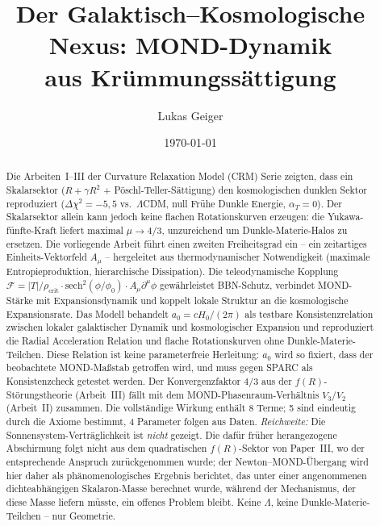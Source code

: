 \documentclass[aps,prd,twocolumn,superscriptaddress,nofootinbib]{revtex4-2}
\begin{document}

\title{Der Galaktisch--Kosmologische Nexus: MOND-Dynamik\\aus Krümmungssättigung}

\author{Lukas Geiger}

\date{\today}

\begin{abstract}
Die Arbeiten~I--III der Curvature Relaxation Model (CRM) Serie zeigten, dass ein Skalarsektor ($R + \gamma R^2$ + P\"oschl-Teller-S\"attigung) den kosmologischen dunklen Sektor reproduziert ($\Delta\chi^2 = -5{,}5$ vs.\ $\Lambda$CDM, null Fr\"uhe Dunkle Energie, $\alpha_T = 0$). Der Skalarsektor allein kann jedoch keine flachen Rotationskurven erzeugen: die Yukawa-f\"unfte-Kraft liefert maximal $\mu \to 4/3$, unzureichend um Dunkle-Materie-Halos zu ersetzen. Die vorliegende Arbeit f\"uhrt einen zweiten Freiheitsgrad ein -- ein zeitartiges Einheits-Vektorfeld $A_\mu$ -- hergeleitet aus thermodynamischer Notwendigkeit (maximale Entropieproduktion, hierarchische Dissipation). Die teleodynamische Kopplung $\mathcal{F} = |T|/\rho_{\mathrm{crit}} \cdot \mathrm{sech}^2(\phi/\phi_0) \cdot A_\mu\partial^\mu\phi$ gew\"ahrleistet BBN-Schutz, verbindet MOND-St\"arke mit Expansionsdynamik und koppelt lokale Struktur an die kosmologische Expansionsrate. Das Modell behandelt $a_0 = cH_0/(2\pi)$ als testbare Konsistenzrelation zwischen lokaler galaktischer Dynamik und kosmologischer Expansion und reproduziert die Radial Acceleration Relation und flache Rotationskurven ohne Dunkle-Materie-Teilchen. Diese Relation ist keine parameterfreie Herleitung: $a_0$ wird so fixiert, dass der beobachtete MOND-Ma\ss{}stab getroffen wird, und muss gegen SPARC als Konsistenzcheck getestet werden. Der Konvergenzfaktor $4/3$ aus der $f(R)$-St\"orungstheorie (Arbeit~III) f\"allt mit dem MOND-Phasenraum-Verh\"altnis $V_3/V_2$ (Arbeit~II) zusammen. Die vollst\"andige Wirkung enth\"alt 8 Terme; 5 sind eindeutig durch die Axiome bestimmt, 4 Parameter folgen aus Daten. \textit{Reichweite:} Die Sonnensystem-Vertr\"aglichkeit ist \textit{nicht} gezeigt. Die daf\"ur fr\"uher herangezogene Abschirmung folgt nicht aus dem quadratischen $f(R)$-Sektor von Paper~III, wo der entsprechende Anspruch zur\"uckgenommen wurde; der Newton--MOND-\"Ubergang wird hier daher als ph\"anomenologisches Ergebnis berichtet, das unter einer angenommenen dichteabh\"angigen Skalaron-Masse berechnet wurde, w\"ahrend der Mechanismus, der diese Masse liefern m\"usste, ein offenes Problem bleibt. Keine $\Lambda$, keine Dunkle-Materie-Teilchen -- nur Geometrie.
\end{abstract}
\end{document}
